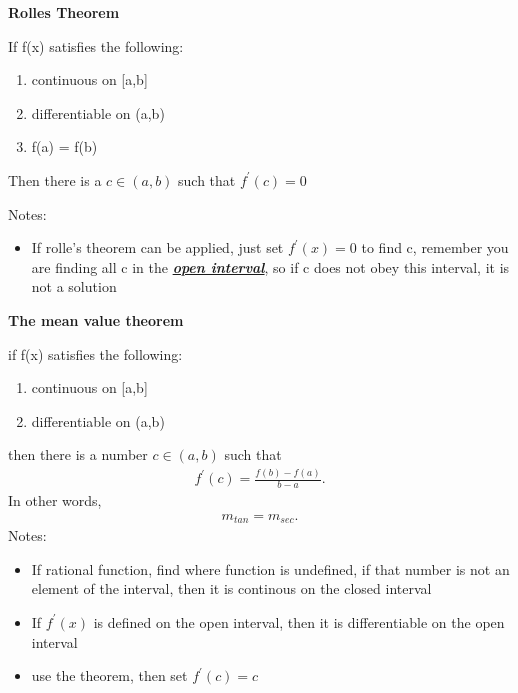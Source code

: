 \documentclass{report}
\begin{document}
    \bigbreak \noindent \bigbreak \noindent 
    \begin{large}
        \textbf{Rolles Theorem}
    \end{large}
         \bigbreak \noindent 
     If f(x) satisfies the following:
     \begin{enumerate}
       \item continuous on [a,b]
        \item differentiable on (a,b)
        \item f(a) = f(b)
     \end{enumerate}
     \smallbreak \noindent
     Then there is a $c \in (a,b)$ such that $f^{\prime}(c) = 0$ 

     \bigbreak \noindent 
     Notes:
     \begin{itemize}
       \item If rolle's theorem can be applied, just set $f^{\prime}(x) = 0$ to find c, remember you are finding all c in the \textbf{\textit{\underline{open interval}}}, so if c does not obey this interval, it is not a solution
     \end{itemize}

     \pagebreak \bigbreak \noindent
     \begin{large}
         \textbf{The mean value theorem }
     \end{large}
           \bigbreak \noindent 
     if f(x) satisfies the following:
     \begin{enumerate}
       \item continuous on [a,b]
        \item differentiable on (a,b)
     \end{enumerate}
     \smallbreak \noindent
     then there is a number $c \in (a,b)$ such that
     \begin{align*}
       f^{\prime}(c) = \frac{f(b) - f(a)}{b -a}
     .\end{align*}
     \bigbreak \noindent 
     In other words,
     \begin{align*}
       m_{tan} = m_{sec}
     .\end{align*}
     \bigbreak \noindent 
     Notes:
     \begin{itemize}
       \item If rational function, find where function is undefined, if that number is not an element of the interval, then it is continous on the closed interval
        \item If $f^{\prime}(x)$ is defined on the open interval, then it is differentiable on the open interval
        \item use the theorem, then set $f^{\prime}(c) = c$
     \end{itemize}
\end{document}
